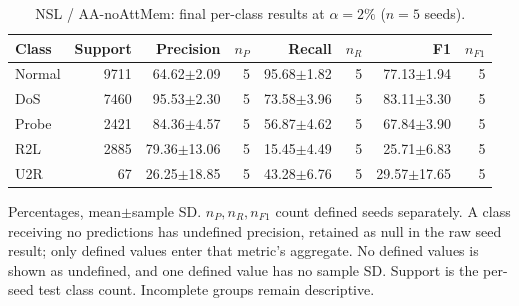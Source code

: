 \begin{table}[t]
\centering\scriptsize
\setlength{\tabcolsep}{3.3pt}
\caption{NSL / AA-noAttMem: final per-class results at $\alpha=2\%$ ($n=5$ seeds).}\label{tab:forgetting-class-nsl_kdd-aa-noattmem}
\begin{tabular}{lrrrrrrr}
\toprule
Class & Support & Precision & $n_P$ & Recall & $n_R$ & F1 & $n_{F1}$ \\
\midrule
Normal & 9711 & 64.62$\pm$2.09 & 5 & 95.68$\pm$1.82 & 5 & 77.13$\pm$1.94 & 5 \\
DoS & 7460 & 95.53$\pm$2.30 & 5 & 73.58$\pm$3.96 & 5 & 83.11$\pm$3.30 & 5 \\
Probe & 2421 & 84.36$\pm$4.57 & 5 & 56.87$\pm$4.62 & 5 & 67.84$\pm$3.90 & 5 \\
R2L & 2885 & 79.36$\pm$13.06 & 5 & 15.45$\pm$4.49 & 5 & 25.71$\pm$6.83 & 5 \\
U2R & 67 & 26.25$\pm$18.85 & 5 & 43.28$\pm$6.76 & 5 & 29.57$\pm$17.65 & 5 \\
\bottomrule
\end{tabular}
\par\smallskip\begin{minipage}{0.98\textwidth}\scriptsize Percentages, mean$\pm$sample SD. $n_P,n_R,n_{F1}$ count defined seeds separately. A class receiving no predictions has undefined precision, retained as null in the raw seed result; only defined values enter that metric's aggregate. No defined values is shown as undefined, and one defined value has no sample SD. Support is the per-seed test class count. Incomplete groups remain descriptive.\end{minipage}
\end{table}

